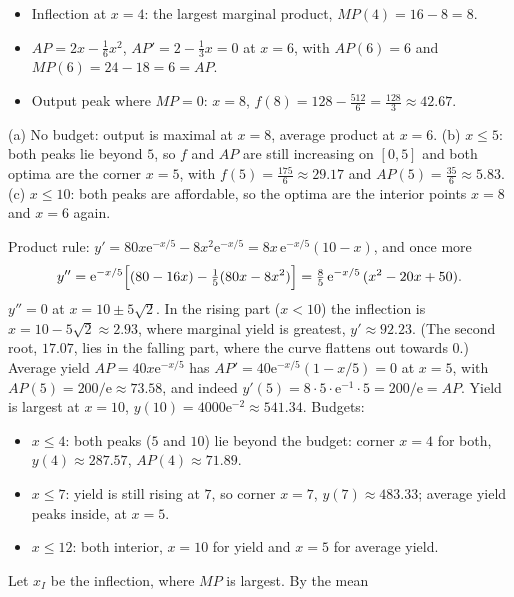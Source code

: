 \begin{solutions}
\begin{itemize}[leftmargin=1.2em,itemsep=0.2ex]
          \item Inflection at $x=4$: the largest marginal product,
                $MP(4)=16-8=8$.
          \item $AP=2x-\tfrac16x^{2}$, $AP'=2-\tfrac13x=0$ at $x=6$, with
                $AP(6)=6$ and $MP(6)=24-18=6=AP$. \checkmark
          \item Output peak where $MP=0$: $x=8$, $f(8)=128-\tfrac{512}{6}
                =\tfrac{128}{3}\approx42.67$.
        \end{itemize}
        (a) No budget: output is maximal at $x=8$, average product at
        $x=6$. (b) $x\le5$: both peaks lie beyond $5$, so $f$ and $AP$ are
        still increasing on $[0,5]$ and both optima are the corner $x=5$,
        with $f(5)=\tfrac{175}{6}\approx29.17$ and $AP(5)=\tfrac{35}{6}
        \approx5.83$. (c) $x\le10$: both peaks are affordable, so the
        optima are the interior points $x=8$ and $x=6$ again.
  \item Product rule:
        $y'=80x\mathrm{e}^{-x/5}-8x^{2}\mathrm{e}^{-x/5}
        =8x\,\mathrm{e}^{-x/5}(10-x)$, and once more
        \[
          y''=\mathrm{e}^{-x/5}\Bigl[(80-16x)-\tfrac15(80x-8x^{2})\Bigr]
             =\tfrac85\,\mathrm{e}^{-x/5}\,(x^{2}-20x+50) .
        \]
        $y''=0$ at $x=10\pm5\sqrt2$. In the rising part ($x<10$) the
        inflection is $x=10-5\sqrt2\approx2.93$, where marginal yield is
        greatest, $y'\approx92.23$. (The second root, $17.07$, lies in the
        falling part, where the curve flattens out towards $0$.)
        Average yield $AP=40x\mathrm{e}^{-x/5}$ has
        $AP'=40\mathrm{e}^{-x/5}(1-x/5)=0$ at $x=5$, with
        $AP(5)=200/\mathrm{e}\approx73.58$, and indeed
        $y'(5)=8\cdot5\cdot\mathrm{e}^{-1}\cdot5=200/\mathrm{e}=AP$.
        Yield is largest at $x=10$, $y(10)=4000\mathrm{e}^{-2}\approx541.34$.
        Budgets:
        \begin{itemize}[leftmargin=1.2em,itemsep=0.2ex]
          \item $x\le4$: both peaks ($5$ and $10$) lie beyond the budget:
                corner $x=4$ for both, $y(4)\approx287.57$,
                $AP(4)\approx71.89$.
          \item $x\le7$: yield is still rising at $7$, so corner $x=7$,
                $y(7)\approx483.33$; average yield peaks inside, at $x=5$.
          \item $x\le12$: both interior, $x=10$ for yield and $x=5$ for
                average yield.
        \end{itemize}
  \item Let $x_{I}$ be the inflection, where $MP$ is largest. By the mean

\end{solutions}

